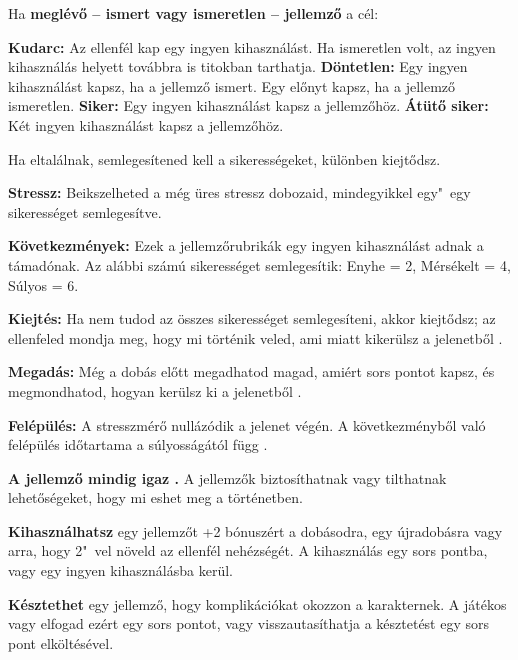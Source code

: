 \begin{multicols*}{2}
Ha \textbf{meglévő -- ismert vagy ismeretlen -- jellemző} a cél:

\begin{itemize}
    \failureitem \textbf{Kudarc:} Az ellenfél kap egy ingyen kihasználást. Ha ismeretlen volt, az ingyen kihasználás helyett továbbra is titokban tarthatja.
    \tieitem \textbf{Döntetlen:} Egy ingyen kihasználást kapsz, ha a jellemző ismert. Egy előnyt kapsz, ha a jellemző ismeretlen.
    \successitem \textbf{Siker:} Egy ingyen kihasználást kapsz a jellemzőhöz.
    \successwithstyleitem \textbf{Átütő siker:} Két ingyen kihasználást kapsz a jellemzőhöz.
\end{itemize}


Ha eltalálnak, semlegesítened kell a sikerességeket, különben kiejtődsz.

\textbf{Stressz:} Beikszelheted a még üres stressz dobozaid, mindegyikkel egy"~egy sikerességet semlegesítve.

\textbf{Következmények:} Ezek a jellemzőrubrikák egy ingyen kihasználást adnak a támadónak. Az alábbi számú sikerességet semlegesítik: Enyhe = 2, Mérsékelt = 4, Súlyos = 6.

\textbf{Kiejtés:} Ha nem tudod az összes sikerességet semlegesíteni, akkor kiejtődsz; az ellenfeled mondja meg, hogy mi történik veled, ami miatt kikerülsz a jelenetből .

\textbf{Megadás:} Még a dobás előtt megadhatod magad, amiért sors pontot kapsz, és megmondhatod, hogyan kerülsz ki a jelenetből .

\textbf{Felépülés:} A stresszmérő nullázódik a jelenet végén. A következményből való felépülés időtartama a súlyosságától függ .


\textbf{A jellemző mindig igaz .} A jellemzők biztosíthatnak vagy tilthatnak lehetőségeket, hogy mi eshet meg a történetben.

\textbf{Kihasználhatsz } egy jellemzőt +2 bónuszért a dobásodra, egy újradobásra vagy arra, hogy 2"~vel növeld az ellenfél nehézségét. A kihasználás egy sors pontba, vagy egy ingyen kihasználásba kerül.

\textbf{Késztethet } egy jellemző, hogy komplikációkat okozzon a karakternek. A játékos vagy elfogad ezért egy sors pontot, vagy visszautasíthatja a késztetést egy sors pont elköltésével.

\end{multicols*}

